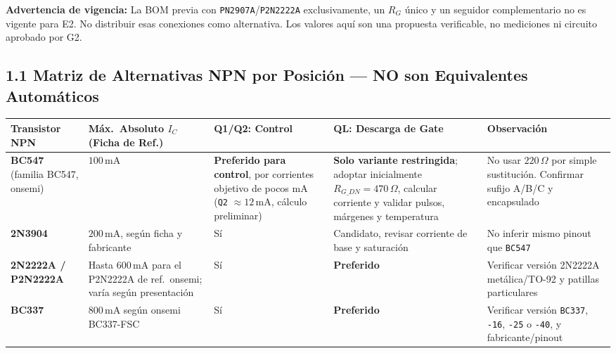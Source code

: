 \documentclass[10pt, a4paper, landscape]{article}
\begin{document}
\vspace{0.12cm}
\noindent
\textbf{Advertencia de vigencia:} La BOM previa con \texttt{PN2907A}/\texttt{P2N2222A} exclusivamente, un $R_G$ único y un seguidor complementario no es vigente para E2. No distribuir esas conexiones como alternativa. Los valores aquí son una propuesta verificable, no mediciones ni circuito aprobado por G2.

\newpage
\subsection*{1.1 Matriz de Alternativas NPN por Posición — NO son Equivalentes Automáticos}

\par\vspace{0.1cm}\noindent
\renewcommand{\arraystretch}{1.28}
{\small
\begin{tabularx}{\linewidth}{|>{\raggedright\arraybackslash}p{3.4cm}|>{\raggedright\arraybackslash}p{3.2cm}|>{\raggedright\arraybackslash}p{4.5cm}|>{\raggedright\arraybackslash}p{6.2cm}|>{\raggedright\arraybackslash}X|}
\hline
\rowcolor{ucbgray}
\textbf{Transistor NPN} & \textbf{Máx.\ Absoluto $I_C$ (Ficha de Ref.)} & \textbf{Q1/Q2: Control} & \textbf{QL: Descarga de Gate} & \textbf{Observación} \\ \hline
\textbf{BC547} (familia BC547, onsemi) & \textbf{$100\,\text{mA}$} & \textbf{Preferido para control}, por corrientes objetivo de pocos mA (\texttt{Q2} $\approx 12\,\text{mA}$, cálculo preliminar) & \textbf{Solo variante restringida}; adoptar inicialmente $R_{G\_DN}=470\,\Omega$, calcular corriente y validar pulsos, márgenes y temperatura & No usar $220\,\Omega$ por simple sustitución. Confirmar sufijo A/B/C y encapsulado \\ \hline
\textbf{2N3904} & \textbf{$200\,\text{mA}$}, según ficha y fabricante & Sí & Candidato, revisar corriente de base y saturación & No inferir mismo pinout que \texttt{BC547} \\ \hline
\textbf{2N2222A / P2N2222A} & Hasta \textbf{$600\,\text{mA}$} para el P2N2222A de ref.\ onsemi; varía según presentación & Sí & \textbf{Preferido} & Verificar versión 2N2222A metálica/TO-92 y patillas particulares \\ \hline
\textbf{BC337} & \textbf{$800\,\text{mA}$} según onsemi BC337-FSC & Sí & \textbf{Preferido} & Verificar versión \texttt{BC337}, \texttt{-16}, \texttt{-25} o \texttt{-40}, y fabricante/pinout \\ \hline
\end{tabularx}
}
\end{document}

